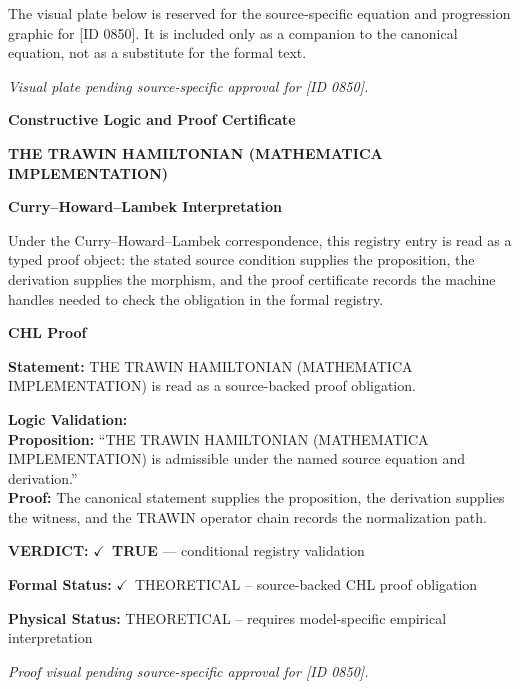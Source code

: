 \begingroup\footnotesize\sloppy
The visual plate below is reserved for the source-specific equation and progression graphic for [ID 0850]. It is included only as a companion to the canonical equation, not as a substitute for the formal text.
\par\endgroup
\begingroup\footnotesize\itshape
Visual plate pending source-specific approval for [ID 0850].
\par\endgroup

\clearpage
\begingroup\tzpsupportsetup
\noindent\textbf{\fontsize{10.8pt}{12.8pt}\selectfont [ID 0850] Constructive Logic and Proof Certificate}\par
\noindent\textbf{\fontsize{10pt}{12pt}\selectfont THE TRAWIN HAMILTONIAN (MATHEMATICA IMPLEMENTATION)}\par
\vspace{0.45em}
\begingroup
\footnotesize
\setlength{\parskip}{0.22em}
\setlength{\parindent}{0pt}
\noindent\textbf{Curry--Howard--Lambek Interpretation}\par
Under the Curry--Howard--Lambek correspondence, this registry entry is read as a typed proof
object: the stated source condition supplies the proposition, the derivation supplies the
morphism, and the proof certificate records the machine handles needed to check the obligation
in the formal registry.

\vspace{0.45em}
\noindent\textbf{CHL Proof}\par
\textbf{Statement:} THE TRAWIN HAMILTONIAN (MATHEMATICA IMPLEMENTATION) is read as a source-backed proof obligation.

\textbf{Logic Validation:}\\
\textbf{Proposition:} ``THE TRAWIN HAMILTONIAN (MATHEMATICA IMPLEMENTATION) is admissible under the named source equation and derivation.''\\
\textbf{Proof:} The canonical statement supplies the proposition, the derivation supplies the witness, and the TRAWIN operator chain records the normalization path.

\textbf{VERDICT:} \ensuremath{\checkmark}\ \textbf{TRUE} --- conditional registry validation

\textbf{Formal Status:} \ensuremath{\checkmark}\ THEORETICAL -- source-backed CHL proof obligation

\textbf{Physical Status:} THEORETICAL -- requires model-specific empirical interpretation
\par\vspace{0.45em}
\par
\vfill
\begingroup\footnotesize\itshape
Proof visual pending source-specific approval for [ID 0850].
\par\endgroup
\vfill
\endgroup
\endgroup
